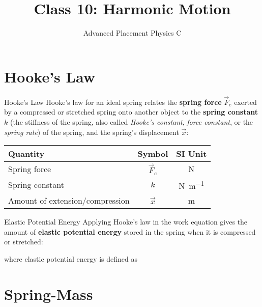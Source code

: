 \documentclass[12pt,compress,aspectratio=169]{beamer}
\title{Class 10: Harmonic Motion}
\subtitle{Advanced Placement Physics C}
\begin{document}
\begin{frame}
  \maketitle
\end{frame}


\section{Hooke's Law}

\begin{frame}{Hooke's Law}
  Hooke's law for an ideal spring relates the \textbf{spring force} $\vec F_e$
  exerted by a compressed or stretched spring onto another object to the
  \textbf{spring constant} $k$ (the stiffness of the spring, also called
  \emph{Hooke's constant}, \emph{force constant}, or the \emph{spring rate}) of
  the spring, and the spring's displacement $\vec x$:

  \begin{center}
    \begin{tabular}{l|c|c}
      \rowcolor{pink}
      \textbf{Quantity} & \textbf{Symbol} & \textbf{SI Unit} \\ \hline
      Spring force                    & $\vec F_e$ & \si\newton \\
      Spring constant                 & $k$        & \si{\newton\per\metre}\\
      Amount of extension/compression & $\vec x$   & \si\metre
    \end{tabular}
  \end{center}
\end{frame}



\begin{frame}{Elastic Potential Energy}
  Applying Hooke's law in the work equation gives the amount of 
  \textbf{elastic potential energy} stored in the spring when it is
  compressed or stretched:


  where elastic potential energy is defined as

\end{frame}



\section{Spring-Mass}
\end{document}
